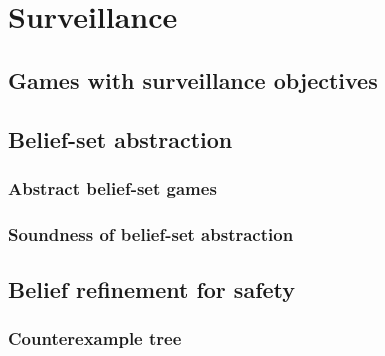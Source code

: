
\chapter{Surveillance}%




% 


\section{Games with surveillance objectives}\label{sec:gamedef}

%
%
\section{Belief-set abstraction}
\subsection{Abstract belief-set games}

%
\subsection{Soundness of belief-set abstraction}

%
%
%
\section{Belief refinement for safety}%

\subsection{Counterexample tree}

